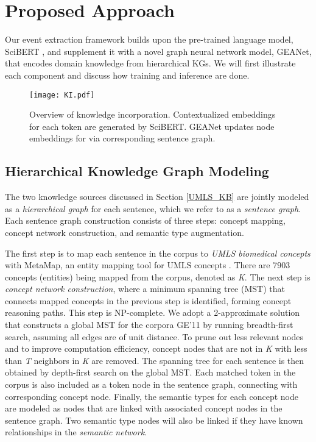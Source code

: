 \documentclass[11pt,a4paper]{article}
\newcommand{\GAENet}{\textrm{GEANet}}
\newcommand{\GE}{\textrm{{\fontfamily{qcr}\selectfont GE'11} }}
\begin{document}
 \section{Proposed Approach}




Our event extraction framework builds upon the pre-trained language model, SciBERT \cite{beltagy-etal-2019-scibert}, and supplement it with a novel graph neural network model, \GAENet{}, that encodes domain knowledge from hierarchical KGs. We will first illustrate each component and discuss how training and inference are done.  

\begin{figure}
  \centering
  \texttt{[image: KI.pdf]}
  \caption{Overview of knowledge incorporation. Contextualized embeddings for each token are generated by SciBERT. \GAENet{} updates node embeddings for  via corresponding sentence graph.}
  \label{KI_figure}
\vspace{-1em}
\end{figure}



\subsection{Hierarchical Knowledge Graph Modeling}
\label{sec:hierarchical_kg}
The two knowledge sources discussed in Section \ref{UMLS_KB} are jointly modeled as a \textit{hierarchical graph} for each sentence, which we refer to as a \textit{sentence graph}. Each sentence graph construction consists of three steps: concept mapping, concept network construction, and semantic type augmentation.

The first step is to map each sentence in the corpus to \textit{UMLS biomedical concepts} with MetaMap, an entity mapping tool for UMLS concepts \cite{aronson2001effective}. 
There are 7903 concepts (entities) being mapped from the corpus, denoted as \textit{K}. 
The next step is \textit{concept network construction}, where a minimum spanning tree (MST) that connects mapped concepts in the previous step is identified, forming concept reasoning paths. This step is NP-complete.\footnotemark{} We adopt a 2-approximate solution that constructs a global MST for the corpora \GE{} by running breadth-first search, assuming all edges are of unit distance. To prune out less relevant nodes and to improve computation efficiency, concept nodes that are not in \textit{K} with less than \textit{T} neighbors in \textit{K} are removed.\footnotemark
{}
The spanning tree for each sentence is then obtained by depth-first search on the global MST.
Each matched token in the corpus is also included as a token node in the sentence graph, connecting with corresponding concept node. Finally, the semantic types for each concept node are modeled as nodes that are linked with associated concept nodes in the sentence graph. Two semantic type nodes will also be linked if they have known relationships in the \textit{semantic network}. 
\end{document}
